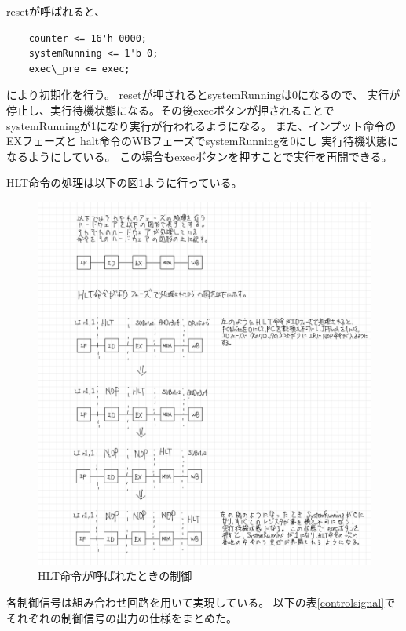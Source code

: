 \documentclass[a4j,titlepage]{jarticle}
\begin{document}
resetが呼ばれると、
\begin{verbatim} 
    counter <= 16'h 0000;
    systemRunning <= 1'b 0;
    exec\_pre <= exec;
\end{verbatim}
により初期化を行う。
resetが押されるとsystemRunningは0になるので、
実行が停止し、実行待機状態になる。その後execボタンが押されることで
systemRunningが1になり実行が行われるようになる。
また、インプット命令のEXフェーズと
halt命令のWBフェーズでsystemRunningを0にし
実行待機状態になるようにしている。
この場合もexecボタンを押すことで実行を再開できる。

HLT命令の処理は以下の図\ref{haltsiyuo}ように行っている。

\begin{figure}[H]
    \begin{center}
    \includegraphics[scale = 0.22]{haltnosiyou.jpg}
    \end{center}
    \caption{HLT命令が呼ばれたときの制御}
    \label{haltsiyuo}
\end{figure}


各制御信号は組み合わせ回路を用いて実現している。
以下の表\ref{controlsignal}でそれぞれの制御信号の出力の仕様をまとめた。
\end{document}
